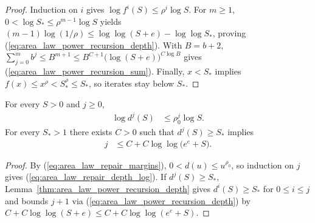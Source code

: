 \begin{proof}
    \leanok
    Induction on $i$ gives $\log f^{i}(S)\le\rho^{i}\log S$. For $m\ge1$,
    $0<\log S_*\le\rho^{m-1}\log S$ yields
    $(m-1)\log(1/\rho)\le\log\log(S+e)-\log\log S_*$, proving
    (\ref{eq:area_law_power_recursion_depth}). With $B=b+2$,
    $\sum_{j=0}^{m}b^{j}\le B^{m+1}\le B^{C+1}\bigl(\log(S+e)\bigr)^{C\log B}$
    gives (\ref{eq:area_law_power_recursion_sum}). Finally, $x<S_*$ implies
    $f(x)\le x^{\rho}<S_*^{\rho}\le S_*$, so iterates stay below $S_*$.
\end{proof}

\begin{lemma}
    \label{thm:area_law_repair_depth}
    \leanok
    For every $S>0$ and $j\ge0$,
    \begin{align}
        \log d^{j}(S) & \le\rho_0^{j}\log S.
        \label{eq:area_law_repair_depth_log}
    \end{align}
    For every $S_*>1$ there exists $C>0$ such that $d^{j}(S)\ge S_*$ implies
    \begin{align}
        j & \le C+C\log\log\bigl(e^{e}+S\bigr).
        \label{eq:area_law_repair_depth_bound}
    \end{align}
\end{lemma}

\begin{proof}
    \leanok
    By (\ref{eq:area_law_repair_margins}), $0<d(u)\le u^{\rho_0}$, so
    induction on $j$ gives (\ref{eq:area_law_repair_depth_log}). If
    $d^{j}(S)\ge S_*$, Lemma~\ref{thm:area_law_power_recursion_depth} gives
    $d^{i}(S)\ge S_*$ for $0\le i\le j$ and bounds $j+1$ via
    (\ref{eq:area_law_power_recursion_depth}) by
    $C+C\log\log(S+e)\le C+C\log\log(e^{e}+S)$.
\end{proof}


